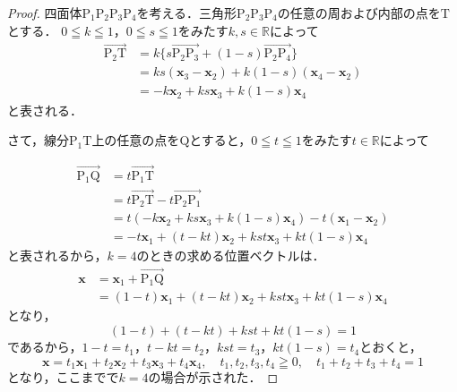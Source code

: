 \documentclass[a4paper,10pt,fleqn]{ltjsarticle}
\begin{document}
\begin{leftbar}
    \begin{proof}
        四面体$\mathrm{P_1 P_2 P_3 P_4}$を考える．三角形$\mathrm{P_2 P_3 P_4}$の任意の周および内部の点を$\mathrm{T}$とする．
        $0 \leqq k \leqq 1$，$0 \leqq s \leqq 1$をみたす$k,s \in \mathbb{R}$によって
        \begin{align*}
            \overrightarrow{\mathrm{P_2 T}} & = k \{ s \overrightarrow{\mathrm{P_2 P_3}} + (1-s) \overrightarrow{\mathrm{P_2 P_4}} \} \\
                                            & = ks(\bm{x}_3 -\bm{x}_2) + k(1-s) (\bm{x}_4-\bm{x}_2)                                   \\
                                            & = -k\bm{x}_2 + ks \bm{x}_3 + k(1-s) \bm{x}_4
        \end{align*}
        と表される．

        さて，線分$\mathrm{P_1 T}$上の任意の点を$\mathrm{Q}$とすると，$0 \leqq t \leqq 1$をみたす$t \in \mathbb{R}$によって

        \begin{align*}
            \overrightarrow{\mathrm{P_1 Q}} & =t \overrightarrow{\mathrm{P_1 T}}                                      \\
                                            & = t\overrightarrow{\mathrm{P_2 T}} - t\overrightarrow{\mathrm{P_2 P_1}} \\
                                            & = t (-k\bm{x}_2 + ks \bm{x}_3 + k(1-s) \bm{x}_4)-t(\bm{x}_1 -\bm{x}_2)  \\
                                            & = -t\bm{x}_1 +(t-kt) \bm{x}_2 + kst \bm{x}_3 +kt(1-s) \bm{x}_4
        \end{align*}
        と表されるから，$k=4$のときの求める位置ベクトルは．
        \begin{align*}
            \bm{x} & = \bm{x}_1 + \overrightarrow{\mathrm{P_1 Q}}                     \\
                   & = (1-t) \bm{x}_1 +(t-kt)\bm{x}_2 +kst \bm{x}_3 +kt(1-s) \bm{x}_4
        \end{align*}
        となり，
        \[
            (1-t)+ (t-kt)+kst + kt(1-s)=1
        \]
        であるから，$1-t = t_1$，$t-kt =t_2$，$kst = t_3$，$kt(1-s)=t_4$とおくと，
        \[
            \bm{x}= t_1 \bm{x}_1 + t_2 \bm{x}_2 + t_3 \bm{x}_3 + t_4 \bm{x}_4 , \quad t_1, t_2 ,t_3 , t_4 \geqq 0 ,\quad  t_1 +t_2 + t_3 + t_4 =1
        \]
        となり，ここまでで$k=4$の場合が示された．


\end{proof}
\end{leftbar}
\end{document}
